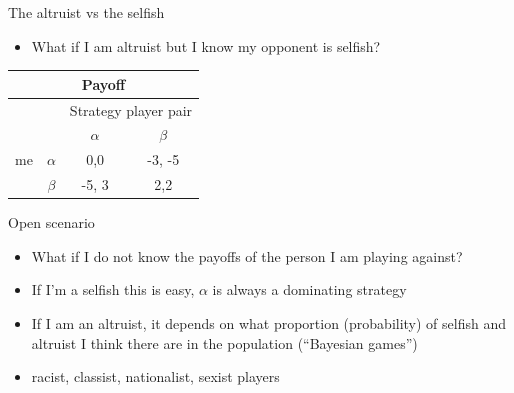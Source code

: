 \documentclass{beamer}
\begin{document}
\begin{frame}{The altruist vs the selfish}
  \begin{itemize}
  \item What if I am altruist but I know my opponent
    is selfish?
  \end{itemize}

\begin{center}
  \begin{tabular}{|c|c|c|c|}
    \hline
    \multicolumn{4}{|c|}{Payoff}\\
    \hline
 &
&
\multicolumn{2}{|c|}{Strategy player pair}\\
    \hline
 & 
     & $\alpha$ & $\beta$  \\
    \hline
me & $\alpha$
     & 0,0 & -3, -5 \\
    \hline
 & $\beta$
     & -5, 3 & 2,2 \\
    \hline
  \end{tabular}
\end{center}

\end{frame}

\begin{frame}{Open scenario}
  \begin{itemize}
  \item What if I do not know the payoffs of the person I am playing
    against?
  \item<2-> If I'm a selfish this is easy, $\alpha$ is always a
    dominating strategy
  \item<3-> If I am an altruist, it depends
    on what proportion (probability) of selfish and altruist
    I think there are in the population
    (``Bayesian games'')
  \item<4-> racist, classist, nationalist, sexist players
  \end{itemize}
\end{frame}
\end{document}
